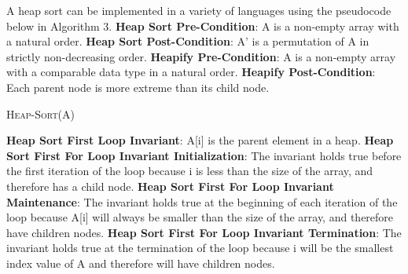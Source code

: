 \documentclass[onecolumn, 12pt, article]{IEEEtran}
\numberwithin{case}{problem}
\numberwithin{condition}{problem}
\numberwithin{condition}{subsection}
\numberwithin{definition}{section}
\theoremstyle{remark}
\numberwithin{question}{problem}
\theoremstyle{plain}
\numberwithin{answer}{problem}
\numberwithin{solution}{section}
\numberwithin{equation}{section}%
\begin{document}
A heap sort can be implemented in a variety of languages using the pseudocode below in Algorithm 3.
\newline
\textbf{Heap Sort Pre-Condition}: A is a non-empty array with a natural order.
\newline
\textbf{Heap Sort Post-Condition}: A' is a permutation of A in strictly non-decreasing order.
\newline
\textbf{Heapify Pre-Condition}: A is a non-empty array with a comparable data type in a natural order.
\newline
\textbf{Heapify Post-Condition}: Each parent node is more extreme than its child  node.
\newline
\begin{algorithm}
\caption {\textsc{Heap-Sort}(A)}
\label{algo:heapsort}
\begin{algorithmic}[1]
\EndIf
{}
\EndIf
{}
\EndIf
{}
\EndProcedure
{}
\EndFor
{}
\EndFor
{}
\EndProcedure
\end{algorithmic}
\end{algorithm}
\newline
\textbf{Heap Sort First Loop Invariant}: A[i] is the parent element in a heap.
\newline
\textbf{Heap Sort First For Loop Invariant Initialization}: The invariant holds true before the first iteration of the loop because i is less than the size of the array, and therefore has a child node.
\newline
\textbf{Heap Sort First For Loop Invariant Maintenance}: The invariant holds true at the beginning of each iteration of the loop because A[i] will always be smaller than the size of the array, and therefore have children nodes.
\newline
\textbf{Heap Sort First For Loop Invariant Termination}: The invariant holds true at the termination of the loop because i will be the smallest index value of A and therefore will have children nodes.
\end{document}
